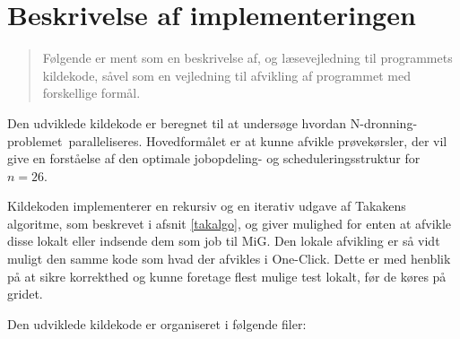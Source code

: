 \documentclass[draft,a4paper,11pt]{article}
\newcommand{\mig}{MiG}
\newcommand{\oc}{One-Click}
\newcommand{\nq}{N-dronning-problemet}
\begin{document}
\section{Beskrivelse af implementeringen}\label{implementering}
\begin{verse}
	Følgende er ment som en beskrivelse af, og læsevejledning til programmets kildekode, såvel som en vejledning til afvikling af programmet med forskellige formål. 
\end{verse}

Den udviklede kildekode er beregnet til at undersøge hvordan \nq\ paralleliseres. Hovedformålet er at kunne afvikle prøvekørsler, der vil give en forståelse af den optimale jobopdeling- og scheduleringsstruktur for $n=26$.

Kildekoden implementerer en rekursiv og en iterativ udgave af Takakens algoritme, som beskrevet i afsnit \ref{takalgo}, og giver mulighed for enten at afvikle disse lokalt eller indsende dem som job til \mig. Den lokale afvikling er så vidt muligt den samme kode som hvad der afvikles i \oc. Dette er med henblik på at sikre korrekthed og kunne foretage flest mulige test lokalt, før de køres på gridet. 


Den udviklede kildekode er organiseret i følgende filer:
\end{document}
